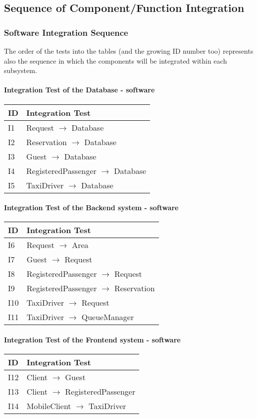 	\subsection{Sequence of Component/Function Integration}
		\subsubsection{Software Integration Sequence}
		The order of the tests into the tables (and the growing ID number too) represents also the sequence in
		which the components will be integrated within each subsystem.
		\paragraph{Integration Test of the Database - software}
		\begin{tabular}{p{2cm} | p{10cm}} \hline
			\textbf{ID} & \textbf{Integration Test} \\ \hline
			I1 & Request $\rightarrow$ Database \\ \hline
			I2 & Reservation $\rightarrow$ Database \\ \hline
			I3 & Guest $\rightarrow$ Database \\ \hline
			I4 & RegisteredPassenger $\rightarrow$ Database \\ \hline
			I5 & TaxiDriver $\rightarrow$ Database \\ \hline
		\end{tabular}
		\paragraph{Integration Test of the Backend system - software}
		\begin{tabular}{p{2cm} | p{10cm}} \hline
			\textbf{ID} & \textbf{Integration Test} \\ \hline
			I6 & Request $\rightarrow$ Area \\ \hline
			I7 & Guest $\rightarrow$ Request \\ \hline
			I8 & RegisteredPassenger $\rightarrow$ Request \\ \hline
			I9 & RegisteredPassenger $\rightarrow$ Reservation \\ \hline
			I10 & TaxiDriver $\rightarrow$ Request \\ \hline
			I11 & TaxiDriver $\rightarrow$ QueueManager \\ \hline
		\end{tabular}
		\paragraph{Integration Test of the Frontend system - software}
		\begin{tabular}{p{2cm} | p{10cm}} \hline
			\textbf{ID} & \textbf{Integration Test} \\ \hline
			I12 & Client $\rightarrow$ Guest \\ \hline
			I13 & Client $\rightarrow$ RegisteredPassenger \\ \hline
			I14 & MobileClient $\rightarrow$ TaxiDriver \\ \hline
		\end{tabular}
